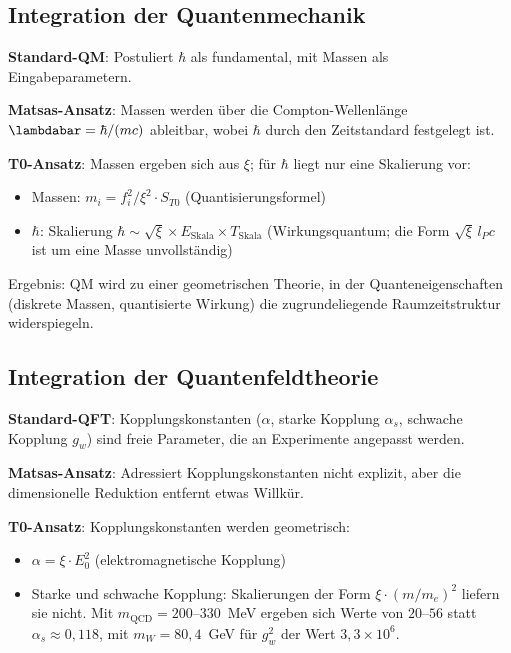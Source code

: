 	\subsection{Integration der Quantenmechanik}
	
	\textbf{Standard-QM}: Postuliert $\hbar$ als fundamental, mit Massen als Eingabeparametern.
	
	\textbf{Matsas-Ansatz}: Massen werden über die Compton-Wellenlänge $\lambdabar = \hbar/(mc)$ ableitbar, wobei $\hbar$ durch den Zeitstandard festgelegt ist.
	
	\textbf{T0-Ansatz}: Massen ergeben sich aus $\xi$; für $\hbar$ liegt nur eine Skalierung vor:
	\begin{itemize}
		\item Massen: $m_i = f_i^2 / \xi^2 \cdot S_{T0}$ (Quantisierungsformel)
		\item $\hbar$: Skalierung $\hbar \sim \sqrt{\xi} \times E_{\text{Skala}} \times T_{\text{Skala}}$ (Wirkungsquantum; die Form $\sqrt{\xi}\, l_P c$ ist um eine Masse unvollständig)
	\end{itemize}
	
	Ergebnis: QM wird zu einer geometrischen Theorie, in der Quanteneigenschaften (diskrete Massen, quantisierte Wirkung) die zugrundeliegende Raumzeitstruktur widerspiegeln.
	
	\subsection{Integration der Quantenfeldtheorie}
	
	\textbf{Standard-QFT}: Kopplungskonstanten ($\alpha$, starke Kopplung $\alpha_s$, schwache Kopplung $g_w$) sind freie Parameter, die an Experimente angepasst werden.
	
	\textbf{Matsas-Ansatz}: Adressiert Kopplungskonstanten nicht explizit, aber die dimensionelle Reduktion entfernt etwas Willkür.
	
	\textbf{T0-Ansatz}: Kopplungskonstanten werden geometrisch:
	\begin{itemize}
		\item $\alpha = \xi \cdot E_0^2$ (elektromagnetische Kopplung)
		\item Starke und schwache Kopplung: Skalierungen der Form $\xi \cdot (m/m_e)^2$ liefern sie nicht. Mit $m_{\text{QCD}} = 200$--$330$~MeV ergeben sich Werte von $20$--$56$ statt $\alpha_s \approx 0{,}118$, mit $m_W = 80{,}4$~GeV für $g_w^2$ der Wert $3{,}3 \times 10^{6}$.
	\end{itemize}
	
